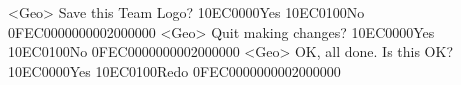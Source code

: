 <Geo> Save this Team Logo? {10}{EC}{00}{00}Yes {10}{EC}{01}{00}No {0F}{EC}{00}{00}{00}{00}{02}{00}{00}{00}
<Geo> Quit making changes? {10}{EC}{00}{00}Yes {10}{EC}{01}{00}No {0F}{EC}{00}{00}{00}{00}{02}{00}{00}{00}
<Geo> OK, all done. 
Is this OK? {10}{EC}{00}{00}Yes {10}{EC}{01}{00}Redo {0F}{EC}{00}{00}{00}{00}{02}{00}{00}{00}

